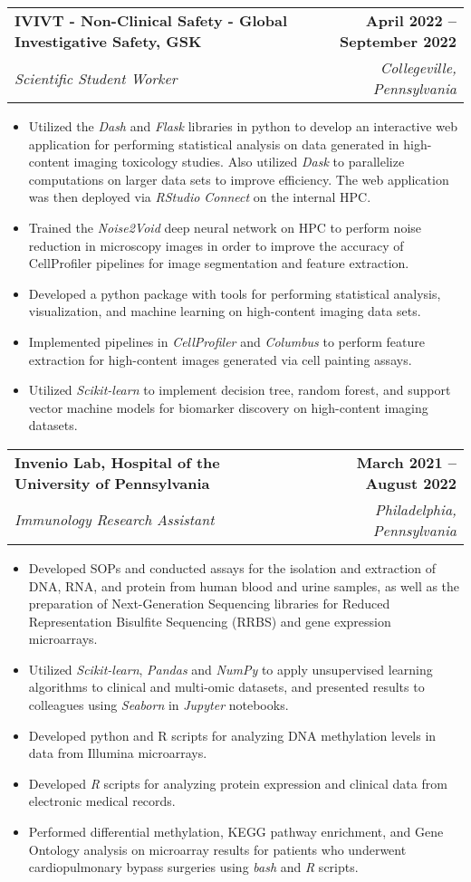 \documentclass[letterpaper,11pt]{article}
\makeatletter
\newcommand{\resumeItem}[1]{
  \item\small{
    {#1 \vspace{-2pt}}
  }
}
\newcommand{\resumeSubheading}[4]{
  \vspace{-2pt}\item
    \begin{tabular*}{1.0\textwidth}[t]{l@{\extracolsep{\fill}}r}
      \textbf{#1} & \textbf{\small #2} \\
      \textit{\small#3} & \textit{\small #4} \\
    \end{tabular*}\vspace{-7pt}
}
\newcommand{\resumeItemListStart}{\begin{itemize}}
\newcommand{\resumeItemListEnd}{\end{itemize}\vspace{-5pt}}
\makeatother
\begin{document}
\resumeSubheading
{IVIVT - Non-Clinical Safety - Global Investigative Safety, GSK}
{April 2022 -- September 2022}
{Scientific Student Worker}
{Collegeville, Pennsylvania}

\vspace{-10pt}
\resumeItemListStart
\resumeItem{
    Utilized the \textit{Dash} and \textit{Flask} libraries in python to develop
    an interactive web application for performing statistical analysis on data
    generated in high-content imaging toxicology studies. Also utilized
    \textit{Dask} to parallelize computations on larger data sets to improve
    efficiency. The web application was then deployed via \textit{RStudio Connect}
    on the internal HPC.
}
\resumeItem{
    Trained the \textit{Noise2Void} deep neural network on HPC to perform noise
    reduction in microscopy images in order to improve the accuracy of CellProfiler
    pipelines for image segmentation and feature extraction.
}
\resumeItem{
    Developed a python package with tools for performing statistical analysis,
    visualization, and machine learning on high-content imaging data sets.
}
\resumeItem{
    Implemented pipelines in \textit{CellProfiler} and \textit{Columbus} to
    perform feature extraction for high-content images generated via cell painting
    assays.
}
\resumeItem{
    Utilized \textit{Scikit-learn} to implement decision tree, random forest, and
    support vector machine models for biomarker discovery on high-content imaging
    datasets.
}
\resumeItemListEnd
\vspace{-2pt}

\resumeSubheading
{Invenio Lab, Hospital of the University of Pennsylvania}
{March 2021 -- August 2022}
{Immunology Research Assistant}
{Philadelphia, Pennsylvania}

\vspace{-10pt}
\resumeItemListStart
\resumeItem{
    Developed SOPs and conducted assays for the isolation and extraction of DNA,
    RNA, and protein from human blood and urine samples, as well as the
    preparation of Next-Generation Sequencing libraries for Reduced Representation
    Bisulfite Sequencing (RRBS) and gene expression microarrays.
}
\resumeItem{
    Utilized \emph{Scikit-learn}, \emph{Pandas} and \emph{NumPy} to apply
    unsupervised learning algorithms to clinical and multi-omic datasets, and
    presented results to colleagues using \emph{Seaborn} in \emph{Jupyter}
    notebooks.
}
\resumeItem{
    Developed python and R scripts for analyzing DNA methylation levels in data
    from Illumina microarrays.
}
\resumeItem{
    Developed \emph{R} scripts for analyzing protein expression and clinical data
    from electronic medical records.
}
\resumeItem{
    Performed differential methylation, KEGG pathway enrichment, and Gene Ontology
    analysis on microarray results for patients who underwent cardiopulmonary
    bypass surgeries using \emph{bash} and \emph{R} scripts.
}
\resumeItemListEnd
\vspace{-2pt}
\end{document}
